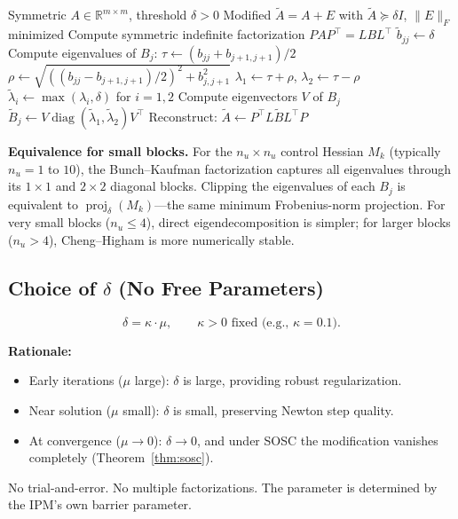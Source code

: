 \documentclass[11pt]{article}
\DeclareMathOperator{\diag}{diag}
\DeclareMathOperator{\proj}{proj}
\begin{document}
\begin{algorithm}[H]
\caption{Cheng--Higham Modified Cholesky}
\label{alg:chenghigham}
\begin{algorithmic}[1]
\REQUIRE Symmetric $A \in \mathbb{R}^{m \times m}$, threshold $\delta > 0$
\ENSURE Modified $\tilde{A} = A + E$ with $\tilde{A} \succeq \delta I$, $\|E\|_F$ minimized
\STATE Compute symmetric indefinite factorization $PAP^\top = LBL^\top$
      \STATE $\tilde{b}_{jj} \leftarrow \delta$
    \ENDIF
    \STATE Compute eigenvalues of $B_j$:
    \STATE \quad $\tau \leftarrow (b_{jj} + b_{j+1,j+1})/2$
    \STATE \quad $\rho \leftarrow \sqrt{((b_{jj} - b_{j+1,j+1})/2)^2 + b_{j,j+1}^2}$
    \STATE \quad $\lambda_1 \leftarrow \tau + \rho$, \quad
           $\lambda_2 \leftarrow \tau - \rho$
      \STATE $\tilde{\lambda}_i \leftarrow \max(\lambda_i, \delta)$ for $i = 1, 2$
      \STATE Compute eigenvectors $V$ of $B_j$
      \STATE $\tilde{B}_j \leftarrow V \diag(\tilde{\lambda}_1, \tilde{\lambda}_2) V^\top$
    \ENDIF
  \ENDIF
\ENDFOR
\STATE Reconstruct: $\tilde{A} \leftarrow P^\top L \tilde{B} L^\top P$
\end{algorithmic}
\end{algorithm}

\textbf{Equivalence for small blocks.} For the $n_u \times n_u$ control Hessian
$M_k$ (typically $n_u = 1$ to $10$), the Bunch--Kaufman factorization captures
all eigenvalues through its $1 \times 1$ and $2 \times 2$ diagonal blocks.
Clipping the eigenvalues of each $B_j$ is equivalent to
$\proj_\delta(M_k)$---the same minimum Frobenius-norm projection. For very
small blocks ($n_u \le 4$), direct eigendecomposition is simpler; for larger
blocks ($n_u > 4$), Cheng--Higham is more numerically stable.


\subsection{Choice of $\delta$ (No Free Parameters)}

\begin{equation}\label{eq:delta}
  \delta = \kappa \cdot \mu, \qquad \kappa > 0 \text{ fixed (e.g., } \kappa = 0.1\text{)}.
\end{equation}

\textbf{Rationale:}
\begin{itemize}
  \item Early iterations ($\mu$ large): $\delta$ is large, providing robust regularization.
  \item Near solution ($\mu$ small): $\delta$ is small, preserving Newton step quality.
  \item At convergence ($\mu \to 0$): $\delta \to 0$, and under SOSC the modification
        vanishes completely (Theorem~\ref{thm:sosc}).
\end{itemize}
No trial-and-error. No multiple factorizations. The parameter is determined by
the IPM's own barrier parameter.
\end{document}
